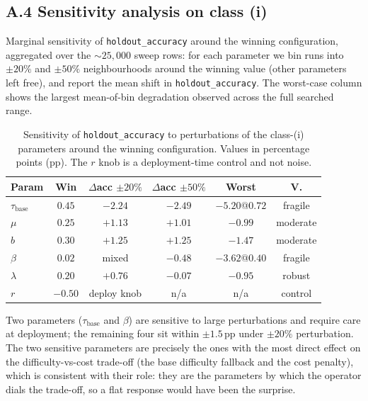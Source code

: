 \documentclass[twocolumn,10pt,a4paper]{article}
\begin{document}
\subsection*{A.4 Sensitivity analysis on class (i)}
Marginal sensitivity of \texttt{holdout\_accuracy} around the winning configuration, aggregated over the $\sim 25{,}000$ sweep rows: for each parameter we bin runs into $\pm 20\%$ and $\pm 50\%$ neighbourhoods around the winning value (other parameters left free), and report the mean shift in \texttt{holdout\_accuracy}. The worst-case column shows the largest mean-of-bin degradation observed across the full searched range.

\begin{table}[H]
\centering
\caption{Sensitivity of \texttt{holdout\_accuracy} to perturbations of the class-(i) parameters around the winning configuration. Values in percentage points (pp). The $r$ knob is a deployment-time control and not noise.}
\label{tab:app_sensitivity}
\scriptsize\setlength{\tabcolsep}{3.5pt}
\begin{tabular}{l c c c c c}
\toprule
\textbf{Param} & Win & $\Delta$acc $\pm 20\%$ & $\Delta$acc $\pm 50\%$ & Worst & V. \\
\midrule
$\tau_\text{base}$     & $0.45$ & $-2.24$ & $-2.49$ & $-5.20$@$0.72$ & fragile \\
$\mu$                  & $0.25$ & $+1.13$ & $+1.01$ & $-0.99$        & moderate \\
$b$                    & $0.30$ & $+1.25$ & $+1.25$ & $-1.47$        & moderate \\
$\beta$                & $0.02$ & mixed   & $-0.48$ & $-3.62$@$0.40$ & fragile \\
$\lambda$              & $0.20$ & $+0.76$ & $-0.07$ & $-0.95$        & robust \\
$r$                    & $-0.50$ & deploy knob & n/a & n/a & control \\
\bottomrule
\end{tabular}
\end{table}

Two parameters ($\tau_\text{base}$ and $\beta$) are sensitive to large perturbations and require care at deployment; the remaining four sit within $\pm 1.5$\,pp under $\pm 20\%$ perturbation. The two sensitive parameters are precisely the ones with the most direct effect on the difficulty-vs-cost trade-off (the base difficulty fallback and the cost penalty), which is consistent with their role: they are the parameters by which the operator dials the trade-off, so a flat response would have been the surprise.
\end{document}
